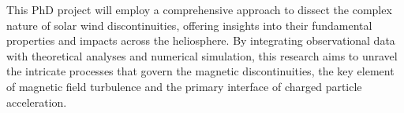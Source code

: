 \documentclass[
  letterpaper,
  DIV=11,
  numbers=noendperiod]{scrartcl}
\begin{document}
This PhD project will employ a comprehensive approach to dissect the complex nature of solar wind discontinuities, offering insights into their fundamental properties and impacts across the heliosphere. By integrating observational data with theoretical analyses and numerical simulation, this research aims to unravel the intricate processes that govern the magnetic discontinuities, the key element of magnetic field turbulence and the primary interface of charged particle acceleration.


  
\end{document}
